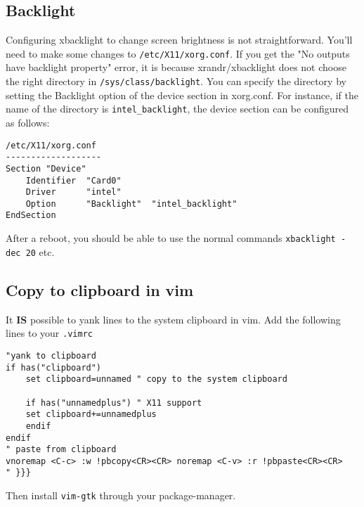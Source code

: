 \documentclass{article}
\begin{document}
\subsection{Backlight}
Configuring xbacklight to change screen brightness is not straightforward.
You'll need to make some changes to \verb`/etc/X11/xorg.conf`.
If you get the "No outputs have backlight property" error, it is because
xrandr/xbacklight does not choose the right directory in \verb'/sys/class/backlight'.
You can specify the directory by setting the Backlight option of the device
section in xorg.conf. For instance, if the name of the directory is
\verb'intel_backlight', the device section can be configured as follows:
\begin{lstlisting}
/etc/X11/xorg.conf
-------------------
Section "Device"
    Identifier  "Card0"
    Driver      "intel"
    Option      "Backlight"  "intel_backlight"
EndSection
\end{lstlisting}
After a reboot, you should be able to use the normal commands
\verb`xbacklight -dec 20` etc.

\subsection{Copy to clipboard in vim}
It \textbf{IS} possible to yank lines to the system clipboard in vim.
Add the following lines to your \verb`.vimrc` 
\begin{lstlisting}
"yank to clipboard
if has("clipboard")
    set clipboard=unnamed " copy to the system clipboard

    if has("unnamedplus") " X11 support
	set clipboard+=unnamedplus
    endif
endif
" paste from clipboard
vnoremap <C-c> :w !pbcopy<CR><CR> noremap <C-v> :r !pbpaste<CR><CR>
" }}}
\end{lstlisting}
Then install \verb`vim-gtk` through your package-manager.
\end{document}
